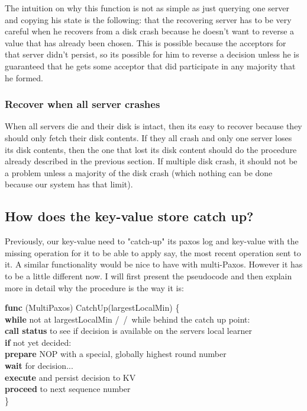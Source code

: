 \documentclass[a4paper]{article}
\begin{document}
The intuition on why this function is not as simple as just querying one server and copying his state is the following: that the recovering server has to be very careful when he recovers from a disk crash because he doesn't want to reverse a value that has already been chosen.
This is possible because the acceptors for that server didn't persist, so its possible for him to reverse a decision unless he is guaranteed that he gets some acceptor that did participate in any majority that he formed.

\subsubsection{Recover when all server crashes}

When all servers die and their disk is intact, then its easy to recover because they should only fetch their disk contents.
If they all crash and only one server loses its disk contents, then the one that lost its disk content should do the procedure already described in the previous section.
If multiple disk crash, it should not be a problem unless a majority of the disk crash (which nothing can be done because our system has that limit).

\subsection{How does the key-value store catch up?}

Previously, our key-value need to "catch-up" its paxos log and key-value with the missing operation for it to be able to apply say, the most recent operation sent to it.
A similar functionality would be nice to have with multi-Paxos.
However it has to be a little different now.
I will first present the pseudocode and then explain more in detail why the procedure is the way it is:

\textbf{func} (MultiPaxos) CatchUp(largestLocalMin) \{ \\
\indent \textbf{while} not at largestLocalMin /\ /\ while behind the catch up point: \\
\indent \indent \textbf{call status} to see if decision is available on the servers local learner \\
\indent \indent \textbf{if} not yet decided: \\
\indent \indent \indent \textbf{prepare} NOP with a special, globally highest round number \\
\indent \indent \indent  \textbf{wait} for decision... \\
\indent \indent \indent \textbf{execute} and persist decision to KV \\
\indent \indent \indent  \textbf{proceed} to next sequence number \\
\indent \}\\
\end{document}
